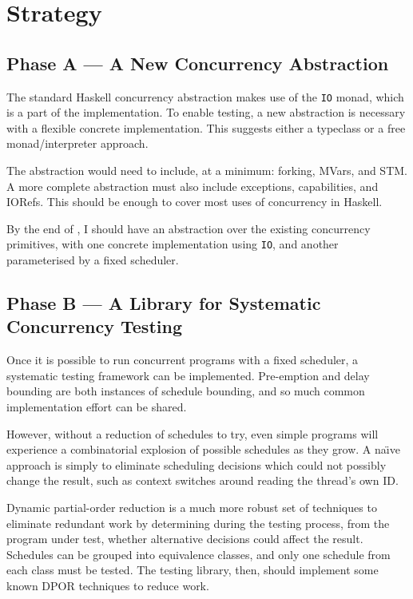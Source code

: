 \section{Strategy}
\label{sec:proposal-strategy}

\subsection{Phase A --- A New Concurrency Abstraction}
\label{sec:proposal-strategy-abstraction}


The standard Haskell concurrency abstraction makes use of the
\verb|IO| monad, which is a part of the implementation. To enable
testing, a new abstraction is necessary with a flexible concrete
implementation. This suggests either a typeclass or a free
monad/interpreter approach.

The abstraction would need to include, at a minimum: forking, MVars,
and STM. A more complete abstraction must also include exceptions,
capabilities, and IORefs. This should be enough to cover most uses of
concurrency in Haskell.

By the end of , I should have an abstraction over the existing
concurrency primitives, with one concrete implementation using
\verb|IO|, and another parameterised by a fixed scheduler.

\subsection{Phase B --- A Library for Systematic Concurrency Testing}
\label{sec:proposal-strategy-sct}


Once it is possible to run concurrent programs with a fixed scheduler,
a systematic testing framework can be implemented. Pre-emption and
delay bounding are both instances of schedule bounding, and so much
common implementation effort can be shared.

However, without a reduction of schedules to try, even simple programs
will experience a combinatorial explosion of possible schedules as
they grow. A na\"{\i}ve approach is simply to eliminate scheduling
decisions which could not possibly change the result, such as context
switches around reading the thread's own ID.

Dynamic partial-order reduction is a much more robust set of
techniques to eliminate redundant work by determining during the
testing process, from the program under test, whether alternative
decisions could affect the result. Schedules can be grouped into
equivalence classes, and only one schedule from each class must be
tested. The testing library, then, should implement some known DPOR
techniques to reduce work.

